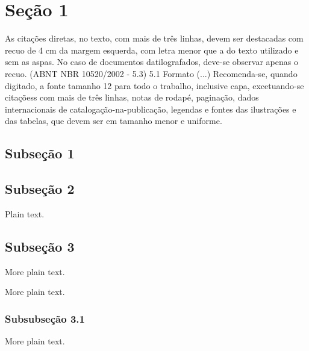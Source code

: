 \documentclass[12pt,twoside,openright,a4paper]{abntex2}
\begin{document}
\section{Seção 1}

\lipsum[7]

\begin{citacao}
As citações diretas, no texto, com mais de três linhas, devem ser
destacadas com recuo de 4 cm da margem esquerda, com letra menor que a do texto
utilizado e sem as aspas. No caso de documentos datilografados, deve-se
observar apenas o recuo. (ABNT NBR 10520/2002 - 5.3) 5.1 Formato
(...)
Recomenda-se, quando digitado, a fonte tamanho 12 para todo o trabalho,
inclusive capa, excetuando-se citaçõess com mais de três linhas, notas de
rodapé, paginação, dados internacionais de catalogação-na-publicação,
legendas e fontes das ilustrações e das tabelas, que devem ser em tamanho menor
e uniforme.
\end{citacao}

\subsection{Subseção 1}

\lipsum[8-10]

\subsection{Subseção 2}

Plain text.

\lipsum[11-15]

\subsection{Subseção 3}

More plain text.

\lipsum[16-20]

More plain text.

\subsubsection{Subsubseção 3.1}

More plain text.

\lipsum[21-25]



\end{document}
